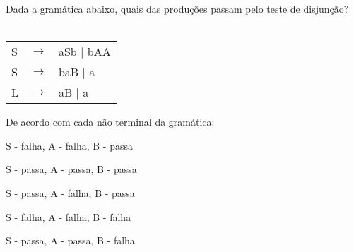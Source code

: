 \question[10]
Dada a gramática abaixo, quais das produções passam pelo teste de disjunção?\\
\\
\begin{tabular}{|l c l}
	S & $\rightarrow$ & aSb | bAA \\
    S & $\rightarrow$ & b{aB} | a \\
	L & $\rightarrow$ & aB | a \\
\end{tabular}

De acordo com cada não terminal da gramática:
\begin{choices}
\item S - falha, A - falha, B - passa
\item S - passa, A - passa, B - passa
\item S - passa, A - falha, B - passa
\item S - falha, A - falha, B - falha
\item S - passa, A - passa, B - falha %
\end{choices}
\answerline


